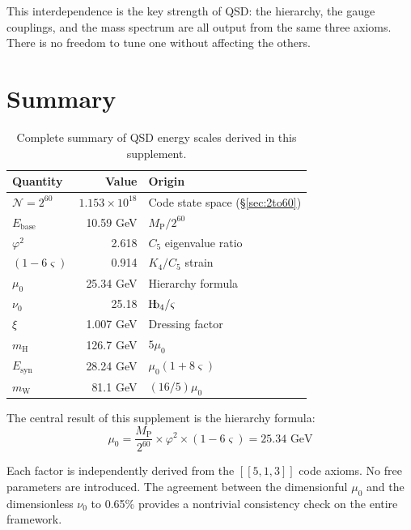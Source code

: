 \documentclass[11pt,a4paper]{article}
\theoremstyle{definition}
\theoremstyle{remark}
\newcommand{\Hb}{\textnormal{H\kern-0.3em b}}
\newcommand{\Hbfour}{\Hb_4}
\newcommand{\gr}{\varphi}
\newcommand{\gs}{\varsigma}
\newcommand{\murad}{\mu_0}
\newcommand{\nurad}{\nu_0}
\newcommand{\Mpl}{M_{\mathrm{P}}}
\newcommand{\Esyn}{E_{\mathrm{syn}}}
\newcommand{\mH}{m_\mathrm{H}}
\newcommand{\mW}{m_\mathrm{W}}
\newcommand{\Ebase}{E_{\mathrm{base}}}
\newcommand{\NN}{\mathcal{N}}
\begin{document}
This interdependence is the key strength of QSD: the hierarchy, the gauge couplings, and the mass spectrum are all output from the same three axioms. There is no freedom to tune one without affecting the others.

\section{Summary}
\label{sec:summary}

\begin{table}[H]
\centering
\begin{tabular}{lrl}
\toprule
\textbf{Quantity} & \textbf{Value} & \textbf{Origin} \\
\midrule
$\NN = 2^{60}$ & $1.153 \times 10^{18}$ & Code state space (\S\ref{sec:2to60}) \\
$\Ebase$ & 10.59 GeV & $\Mpl / 2^{60}$ \\
$\gr^2$ & 2.618 & $C_5$ eigenvalue ratio \\
$(1-6\gs)$ & 0.914 & $K_4/C_5$ strain \\
\midrule
$\murad$ & 25.34 GeV & Hierarchy formula \\
$\nurad$ & 25.18 & $\Hbfour / \gs$ \\
$\xi$ & 1.007 GeV & Dressing factor \\
\midrule
$\mH$ & 126.7 GeV & $5\murad$ \\
$\Esyn$ & 28.24 GeV & $\murad(1+8\gs)$ \\
$\mW$ & 81.1 GeV & $(16/5)\murad$ \\
\bottomrule
\end{tabular}
\caption{Complete summary of QSD energy scales derived in this supplement.}
\label{tab:summary}
\end{table}

The central result of this supplement is the hierarchy formula:
\begin{equation}
\murad = \frac{\Mpl}{2^{60}} \times \gr^2 \times (1 - 6\gs) = 25.34 \text{ GeV}
\end{equation}

Each factor is independently derived from the $[[5,1,3]]$ code axioms. No free parameters are introduced. The agreement between the dimensionful $\murad$ and the dimensionless $\nurad$ to 0.65\% provides a nontrivial consistency check on the entire framework.
\end{document}

